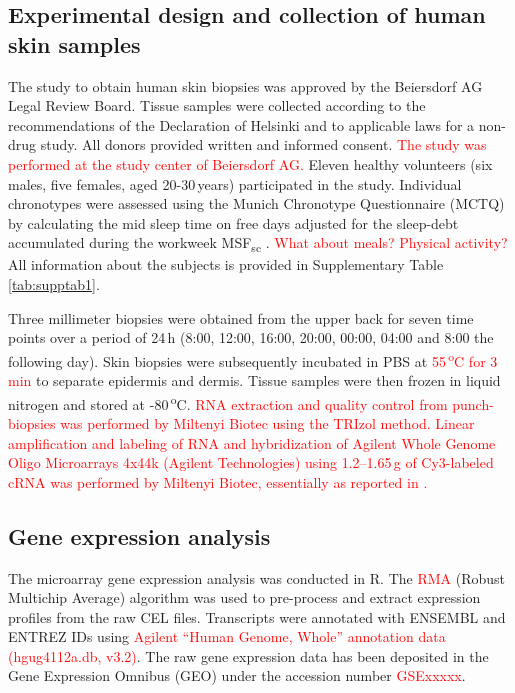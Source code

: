 \subsection*{Experimental design and collection of human skin samples}
The study to obtain human skin biopsies was approved by the Beiersdorf AG Legal Review Board. Tissue samples were collected according to the recommendations of the Declaration of Helsinki and to applicable laws for a non-drug study. All donors provided written and informed consent. \textcolor{red}{The study was performed at the study center of Beiersdorf AG.} Eleven healthy volunteers (six males, five females, aged 20-30\,years) participated in the study. Individual chronotypes were assessed using the Munich Chronotype Questionnaire (MCTQ) by calculating the mid sleep time on free days adjusted for the sleep-debt accumulated during the workweek MSF\textsubscript{sc} \cite{Vetter2021}. \textcolor{red}{What about meals? Physical activity?} All information about the subjects is provided in Supplementary Table \ref{tab:supptab1}.  %

Three millimeter biopsies were obtained from the upper back for seven time points over a period of 24\,h (8:00, 12:00, 16:00, 20:00, 00:00, 04:00 and 8:00 the following day). Skin biopsies were subsequently incubated in PBS at \textcolor{red}{55\,\textsuperscript{o}C for 3\,min} to separate epidermis and dermis. Tissue samples were then frozen in liquid nitrogen and stored at -80\,\textsuperscript{o}C. \textcolor{red}{RNA extraction and quality control from punch-biopsies was performed by Miltenyi Biotec using the TRIzol method. Linear amplification and labeling of RNA and hybridization of Agilent Whole Genome Oligo Microarrays 4x44k (Agilent Technologies) using 1.2--1.65\,\textmu g of Cy3-labeled cRNA was performed by Miltenyi Biotec, essentially as reported in \cite{Duggan1999}.}  

\subsection*{Gene expression analysis}
The microarray gene expression analysis was conducted in R. The \textcolor{red}{RMA} (Robust Multichip Average) algorithm was used to pre-process and extract expression profiles from the raw CEL files. Transcripts were annotated with ENSEMBL and ENTREZ IDs using \textcolor{red}{Agilent ``Human Genome, Whole'' annotation data (hgug4112a.db, v3.2)}. The raw gene expression data has been deposited in the Gene Expression Omnibus (GEO) under the accession number \textcolor{red}{GSExxxxx}. 

